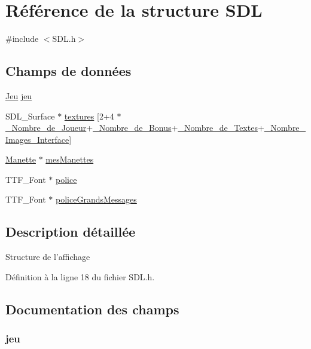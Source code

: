 \hypertarget{struct_s_d_l}{\section{Référence de la structure S\-D\-L}
\label{struct_s_d_l}
}


{\ttfamily \#include $<$S\-D\-L.\-h$>$}

\subsection*{Champs de données}
\begin{DoxyCompactItemize}
\item 
\hyperlink{struct_jeu}{Jeu} \hyperlink{struct_s_d_l_a56ca1ac56f66324ba9bc5868128ddb84}{jeu}
\item 
S\-D\-L\-\_\-\-Surface $\ast$ \hyperlink{struct_s_d_l_af2ecb76ea798efcbd83469418abffe48}{textures} \mbox{[}2+4 $\ast$\hyperlink{_constantes_8h_a505b3b803482fbd73a5eafac78db730f}{\-\_\-\-Nombre\-\_\-de\-\_\-\-Joueur}+\hyperlink{_constantes_8h_af4e31715ab308023d6200e64b86b9946}{\-\_\-\-Nombre\-\_\-de\-\_\-\-Bonus}+\hyperlink{_constantes_8h_a64872e3ddf1efd6847f90dbcb0ed21ce}{\-\_\-\-Nombre\-\_\-de\-\_\-\-Textes}+\hyperlink{_constantes_8h_a228aa6ff538af983b44e972225d962b9}{\-\_\-\-Nombre\-\_\-\-Images\-\_\-\-Interface}\mbox{]}
\item 
\hyperlink{struct_manette}{Manette} $\ast$ \hyperlink{struct_s_d_l_ab0b0a871f5eb61c1171d679a7e568590}{mes\-Manettes}
\item 
T\-T\-F\-\_\-\-Font $\ast$ \hyperlink{struct_s_d_l_a49a11b0728728090fa1189391c9fe0c8}{police}
\item 
T\-T\-F\-\_\-\-Font $\ast$ \hyperlink{struct_s_d_l_a1086358a0d3bf9a044e55f9946bbb869}{police\-Grands\-Messages}
\end{DoxyCompactItemize}


\subsection{Description détaillée}
Structure de l'affichage 

Définition à la ligne 18 du fichier S\-D\-L.\-h.



\subsection{Documentation des champs}
\hypertarget{struct_s_d_l_a56ca1ac56f66324ba9bc5868128ddb84}{
\subsubsection[{jeu}]{ jeu}}\label{struct_s_d_l_a56ca1ac56f66324ba9bc5868128ddb84}


